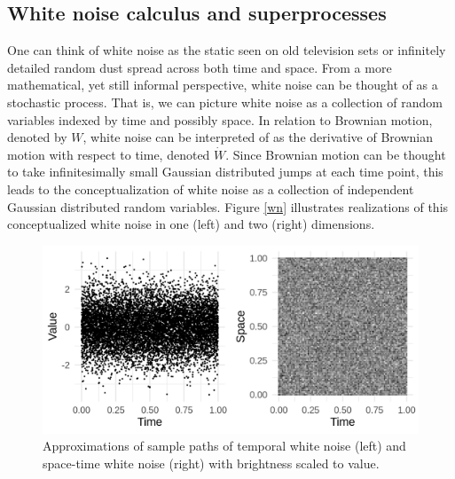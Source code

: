 \documentclass[]{article}
\begin{document}
\hypertarget{white-noise-calculus-and-superprocesses}{%
\subsection{\texorpdfstring{White noise calculus and superprocesses
\label{wnc}}{White noise calculus and superprocesses }}\label{white-noise-calculus-and-superprocesses}}

One can think of white noise as the static seen on old television sets
or infinitely detailed random dust spread across both time and space.
From a more mathematical, yet still informal perspective, white noise
can be thought of as a stochastic process. That is, we can picture white
noise as a collection of random variables indexed by time and possibly
space. In relation to Brownian motion, denoted by \(W\), white noise can
be interpreted of as the derivative of Brownian motion with respect to
time, denoted \(\dot W\). Since Brownian motion can be thought to take
infinitesimally small Gaussian distributed jumps at each time point,
this leads to the conceptualization of white noise as a collection of
independent Gaussian distributed random variables. Figure \ref{wn}
illustrates realizations of this conceptualized white noise in one
(left) and two (right) dimensions.

\begin{figure}

{\centering \includegraphics[width=20.83in]{wn} 

}

\caption{\label{wn}Approximations of sample paths of temporal white noise (left) and space-time white noise (right) with brightness scaled to value.}\label{fig:unnamed-chunk-2}
\end{figure}
\end{document}
